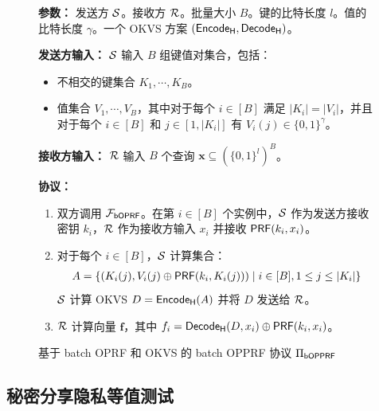 \begin{figure}[!htb]
\begin{framed}
\begin{minipage}[center]{\textwidth}
\begin{trivlist}
\item \textbf{参数：} 发送方 $\mathcal{S}$。接收方 $\mathcal{R}$。批量大小 $B$。键的比特长度 $l$。值的比特长度 $\gamma$。一个 OKVS 方案 $(\mathsf{Encode_H}, \mathsf{Decode_H})$。
\item \textbf{发送方输入：} $\mathcal{S}$ 输入 $B$ 组键值对集合，包括：
\begin{itemize}[itemsep=2pt,topsep=0pt,parsep=0pt,leftmargin=10pt]
\item 不相交的键集合 $K_1, \cdots, K_B$。
\item 值集合 $V_1, \cdots, V_B$，其中对于每个 $i \in [B]$ 满足 $\lvert K_i \rvert = \lvert V_i \rvert$，并且对于每个 $i \in [B]$ 和 $j \in [1, \lvert K_i \rvert]$ 有 $V_i(j) \in \{0,1\}^\gamma$。
\end{itemize}
\item \textbf{接收方输入：} $\mathcal{R}$ 输入 $B$ 个查询 $\textbf{x} \subseteq (\{0,1\}^l)^B$。
\item \textbf{协议：} 
\begin{enumerate} [itemsep=2pt,topsep=0pt,parsep=0pt]
\item 双方调用 $\mathcal{F}_\mathsf{bOPRF}$。在第 $i \in [B]$ 个实例中，$\mathcal{S}$ 作为发送方接收密钥 $k_i$，$\mathcal{R}$ 作为接收方输入 $x_i$ 并接收 $\mathsf{PRF}(k_i,x_i)$。
\item 对于每个 $i \in [B]$，$\mathcal{S}$ 计算集合：
\begin{gather*}
    A=\{(K_i(j), V_i(j) \oplus \mathsf{PRF}(k_i, K_i(j))) \mid i \in [B], 1 \le j \le \lvert K_i \rvert \}
\end{gather*}
$\mathcal{S}$ 计算 OKVS $D = \mathsf{Encode_H}(A)$ 并将 $D$ 发送给 $\mathcal{R}$。
\item $\mathcal{R}$ 计算向量 $\textbf{f}$，其中 $f_i = \mathsf{Decode_H}(D, x_i) \oplus \mathsf{PRF}(k_i, x_i)$。
\end{enumerate}
\end{trivlist}
\end{minipage}
\end{framed}
\caption{基于 batch OPRF 和 OKVS 的 batch OPPRF 协议 $\Pi_\mathsf{bOPPRF}$}\label{fig:proto-bopprf}
\end{figure}

\subsection{秘密分享隐私等值测试}\label{sec:sspeqt}


